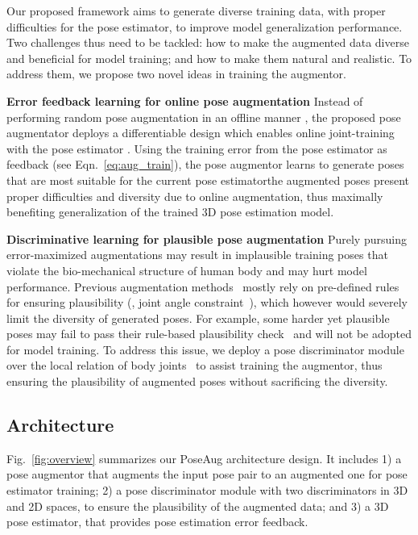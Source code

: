 \documentclass[final]{cvpr}
\newcommand{\myparagraph}[1]{{ \noindent \bf #1}}
\begin{document}
Our proposed framework aims to generate diverse training data, with proper difficulties for the pose estimator, to improve model generalization performance.
Two challenges thus need to be tackled: how to make the augmented data diverse and beneficial for model training; and how to make them natural and realistic. 
To address them, we propose two novel ideas in training the augmentor.

\myparagraph{Error feedback learning for online pose augmentation}
Instead of performing random pose augmentation in an offline manner \cite{rogez2016mocap,chen2016synthesizing,Li_2020_CVPR}, the proposed pose augmentator  deploys  a differentiable design which enables online joint-training with the pose estimator . 
Using the training error from the pose estimator  as feedback (see Eqn.~\eqref{eq:aug_train}), the pose augmentor  learns to generate poses that are most suitable for the current pose estimator\textemdash the augmented poses present proper   difficulties and diversity due to online augmentation, thus maximally benefiting generalization of the trained 3D pose estimation model.

\myparagraph{Discriminative learning for plausible pose augmentation}
Purely pursuing error-maximized augmentations may result in implausible training poses that violate the bio-mechanical structure of human body and may hurt model performance.
Previous augmentation methods~\cite{rogez2016mocap,chen2016synthesizing, Li_2020_CVPR} mostly rely on pre-defined rules for ensuring plausibility  (\eg, joint angle constraint~\cite{akhter2015joint_angle_limit}), which however would severely limit the diversity of generated poses.  
For example, some harder yet plausible  poses  may fail to pass  their rule-based  plausibility check~\cite{Li_2020_CVPR} and will not be adopted for model training.  
To address this issue, we deploy a pose discriminator module over the local relation of body joints~\cite{wandt2019repnet} to assist training the augmentor, thus ensuring the plausibility of augmented poses without sacrificing the diversity.
 
\subsection{Architecture} 
\label{sec:network}
Fig.~\ref{fig:overview} summarizes our PoseAug architecture design. It includes 
1) a pose augmentor that augments the input pose pair  {to an augmented one}  for pose estimator  training; 
2) a pose discriminator module with two discriminators in 3D and 2D spaces, to ensure the plausibility of the augmented data; and 
3) a 3D pose estimator, that provides pose estimation error feedback. 
\end{document}
